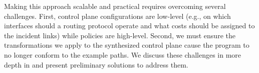 
Making this approach scalable and practical requires overcoming several
challenges. First, control plane configurations are low-level (e.g., on which
interfaces should a routing protocol operate and what costs should be assigned
to the incident links) while policies are high-level. Second, we must ensure
the transformations we apply to the synthesized control plane cause the
program to no longer conform to the example paths.  We
discuss these challenges in more depth in  and present
preliminary solutions to address them.

